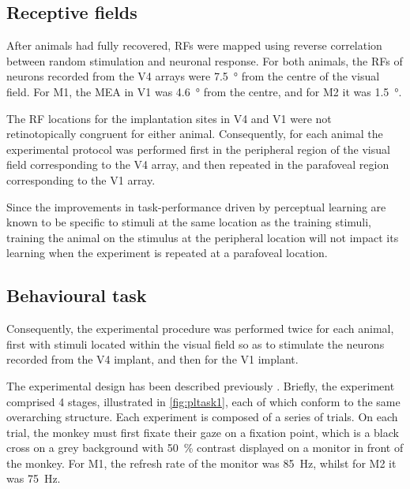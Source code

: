 \subsection{Receptive fields}

After animals had fully recovered, \acp{RF} were mapped using reverse correlation between random stimulation and neuronal response.
For both animals, the \acp{RF} of neurons recorded from the \ac{V4} arrays were \SI{7.5}{\degree} from the centre of the visual field.
For \ac{M1}, the \ac{MEA} in \ac{V1} was \SI{4.6}{\degree} from the centre, and for \ac{M2} it was \SI{1.5}{\degree}.

The \ac{RF} locations for the implantation sites in \ac{V4} and \ac{V1} were not retinotopically congruent for either animal.
Consequently, for each animal the experimental protocol was performed first in the peripheral region of the visual field corresponding to the \ac{V4} array, and then repeated in the parafoveal region corresponding to the \ac{V1} array.

Since the improvements in task-performance driven by perceptual learning are known to be specific to stimuli at the same location as the training stimuli, training the animal on the stimulus at the peripheral location will not impact its learning when the experiment is repeated at a parafoveal location.

\subsection{Behavioural task}

Consequently, the experimental procedure was performed twice for each animal, first with stimuli located within the visual field so as to stimulate the neurons recorded from the \ac{V4} implant, and then for the \ac{V1} implant.

The experimental design has been described previously \citep[see][]{Chen2013}.
Briefly, the experiment comprised 4 stages, illustrated in \autoref{fig:pltask1}, each of which conform to the same overarching structure.
Each experiment is composed of a series of trials.
On each trial, the monkey must first fixate their gaze on a fixation point, which is a black cross on a grey background with \SI{50}{\percent} contrast displayed on a monitor in front of the monkey.
For \ac{M1}, the refresh rate of the monitor was \SI{85}{Hz}, whilst for \ac{M2} it was \SI{75}{Hz}.

